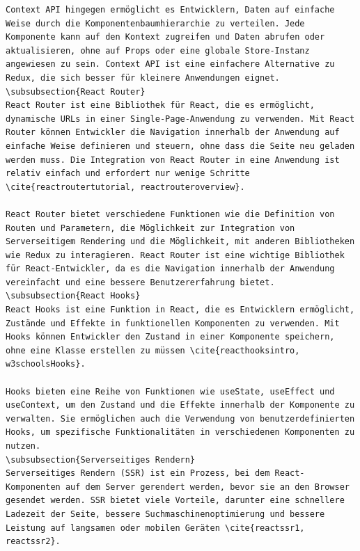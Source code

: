 \begin{lstlisting}
Context API hingegen ermöglicht es Entwicklern, Daten auf einfache Weise durch die Komponentenbaumhierarchie zu verteilen. Jede Komponente kann auf den Kontext zugreifen und Daten abrufen oder aktualisieren, ohne auf Props oder eine globale Store-Instanz angewiesen zu sein. Context API ist eine einfachere Alternative zu Redux, die sich besser für kleinere Anwendungen eignet.
\subsubsection{React Router}
React Router ist eine Bibliothek für React, die es ermöglicht, dynamische URLs in einer Single-Page-Anwendung zu verwenden. Mit React Router können Entwickler die Navigation innerhalb der Anwendung auf einfache Weise definieren und steuern, ohne dass die Seite neu geladen werden muss. Die Integration von React Router in eine Anwendung ist relativ einfach und erfordert nur wenige Schritte \cite{reactroutertutorial, reactrouteroverview}.

React Router bietet verschiedene Funktionen wie die Definition von Routen und Parametern, die Möglichkeit zur Integration von Serverseitigem Rendering und die Möglichkeit, mit anderen Bibliotheken wie Redux zu interagieren. React Router ist eine wichtige Bibliothek für React-Entwickler, da es die Navigation innerhalb der Anwendung vereinfacht und eine bessere Benutzererfahrung bietet.
\subsubsection{React Hooks}
React Hooks ist eine Funktion in React, die es Entwicklern ermöglicht, Zustände und Effekte in funktionellen Komponenten zu verwenden. Mit Hooks können Entwickler den Zustand in einer Komponente speichern, ohne eine Klasse erstellen zu müssen \cite{reacthooksintro, w3schoolsHooks}.

Hooks bieten eine Reihe von Funktionen wie useState, useEffect und useContext, um den Zustand und die Effekte innerhalb der Komponente zu verwalten. Sie ermöglichen auch die Verwendung von benutzerdefinierten Hooks, um spezifische Funktionalitäten in verschiedenen Komponenten zu nutzen.
\subsubsection{Serverseitiges Rendern}
Serverseitiges Rendern (SSR) ist ein Prozess, bei dem React-Komponenten auf dem Server gerendert werden, bevor sie an den Browser gesendet werden. SSR bietet viele Vorteile, darunter eine schnellere Ladezeit der Seite, bessere Suchmaschinenoptimierung und bessere Leistung auf langsamen oder mobilen Geräten \cite{reactssr1, reactssr2}.


\end{lstlisting}
